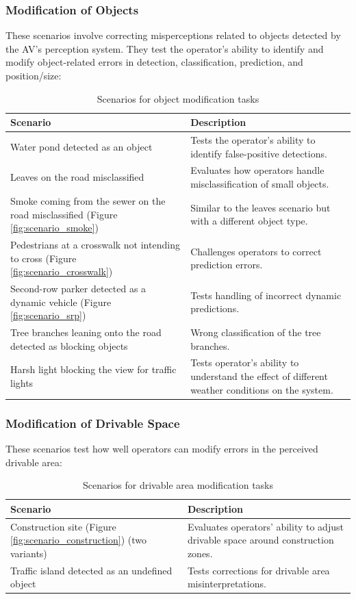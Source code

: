\subsubsection{Modification of Objects}
These scenarios involve correcting misperceptions related to objects detected by the \ac{AV}'s perception system. They test the operator's ability to identify and modify object-related errors in detection, classification, prediction, and position/size:
\begin{table}[h!]
    \centering
    \begin{tabular}{|p{6cm}|p{7.8cm}|}
    \hline
    \textbf{Scenario} & \textbf{Description} \\
    \hline
    Water pond detected as an object & Tests the operator's ability to identify false-positive detections. \\ \hline
    Leaves on the road misclassified & Evaluates how operators handle misclassification of small objects. \\ \hline
    Smoke coming from the sewer on the road misclassified (Figure \ref{fig:scenario_smoke})& Similar to the leaves scenario but with a different object type. \\ \hline
    Pedestrians at a crosswalk not intending to cross (Figure \ref{fig:scenario_crosswalk}) & Challenges operators to correct prediction errors. \\ \hline
    Second-row parker detected as a dynamic vehicle (Figure \ref{fig:scenario_srp}) & Tests handling of incorrect dynamic predictions. \\ \hline
    Tree branches leaning onto the road detected as blocking objects & Wrong classification of the tree branches. \\ \hline
    Harsh light blocking the view for traffic lights & Tests operator's ability to understand the effect of different weather conditions on the system. \\ \hline
    \end{tabular}
    \caption{Scenarios for object modification tasks}
    \label{table:scenariosobjectmodification}
    \end{table}
\subsubsection{Modification of Drivable Space}
These scenarios test how well operators can modify errors in the perceived drivable area:
\begin{table}[h!]
    \centering
    \begin{tabular}{|p{6cm}|p{7.8cm}|}
    \hline
    \textbf{Scenario} & \textbf{Description} \\
    \hline
    Construction site (Figure \ref{fig:scenario_construction}) (two variants) & Evaluates operators' ability to adjust drivable space around construction zones. \\ \hline
    Traffic island detected as an undefined object & Tests corrections for drivable area misinterpretations. \\ \hline
    \end{tabular}
    \caption{Scenarios for drivable area modification tasks}
    \label{table:scenariosdrivablemodification}
    \end{table}

